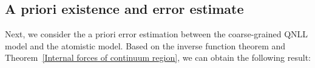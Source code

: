 	
	
		
		
		
		
	
	
	
	



\subsection{A priori existence and error estimate}
\label{sec: priori_anal_qnll_cg}

Next, we consider the a priori error estimation between the coarse-grained QNLL model and the atomistic model. Based on the inverse function theorem and Theorem~\ref{Internal forces of continuum region}, we can obtain the following result:


